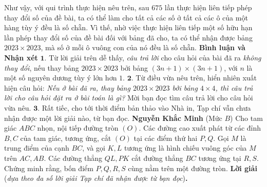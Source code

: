 \begin{multicols}{2}
	\vskip 0.05cm
	Như vậy, với qui trình thực hiện nêu trên, sau $675$ lần thực hiện liên tiếp phép thay đổi số của đề bài, ta có thể làm cho tất cả các số ở tất cả các ô của một hàng tùy ý đều là số chẵn. Vì thế, nhờ việc thực hiện liên tiếp một số hữu hạn lần phép thay đổi số của đề bài đối với bảng đã cho, ta có thể nhận được bảng $2023 \times 2023$, mà số ở mỗi ô vuông con của nó đều là số chẵn.
	\vskip 0.05cm
	\textbf{Bình luận và Nhận xét}
	\vskip 0.05cm
	$\pmb{1.}$ Từ lời giải trên dễ thấy, \textit{câu trả lời} cho câu hỏi của bài đã ra \textit{không thay đổi}, nếu thay bảng $2023 \times 2023$ bởi bảng $(3n + 1) \times (3n + 1)$, với $n$ là một số nguyên dương tùy ý lớn hơn $1$.
	\vskip 0.05cm
	$\pmb{2.}$ Từ điều vừa nêu trên, hiển nhiên xuất hiện câu hỏi: \textit{Nếu ở bài đã ra, thay bảng $2023 \times 2023$ bởi bảng $4 \times 4$, thì câu trả lời cho câu hỏi đặt ra ở bài toán là gì?} Mời bạn đọc tìm câu trả lời cho câu hỏi vừa nêu.
	\vskip 0.05cm
	$\pmb{3.}$ Rất tiếc, cho tới thời điểm bản thảo vào Nhà in, Tạp chí vẫn chưa nhận được một lời giải nào, từ bạn đọc.
	\vskip 0.05cm
	\hfill\textbf{Nguyễn Khắc Minh}
	\vskip 0.05cm
	{}
	(Mức $B$) Cho tam giác $ABC$ nhọn, nội tiếp đường tròn $(O)$. Các đường cao xuất phát từ các đỉnh $B,C$ của tam giác, tương ứng, cắt $(O)$ tại các điểm thứ hai $P,Q$. Gọi $M$ là trung điểm của cạnh $BC$, và gọi $K, L$ tương ứng là hình chiếu vuông góc của $M$ trên $AC, A B$. Các đường thẳng $Q L, P K$ cắt đường thẳng $B C$ tương ứng tại $R, S$. Chứng minh rằng, bốn điểm $P, Q, R, S$ cùng nằm trên một đường tròn.
	\vskip 0.05cm
	\textbf{Lời giải} (\textit{dựa theo đa số lời giải Tạp chí đã nhận được từ bạn đọc})\textbf{.}
	

\end{multicols}
